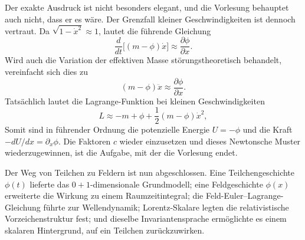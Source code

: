 Der exakte Ausdruck ist nicht besonders elegant, und die Vorlesung behauptet auch nicht, dass er es wäre. Der Grenzfall kleiner Geschwindigkeiten ist dennoch vertraut. Da \(\sqrt{1-\dot x^2}\approx1\), lautet die führende Gleichung
\begin{equation}
\frac{d}{dt}\bigl[(m-\phi)\dot x\bigr]
\approx
\frac{\partial\phi}{\partial x}.
\end{equation}
Wird auch die Variation der effektiven Masse störungstheoretisch behandelt, vereinfacht sich dies zu
\begin{equation}
(m-\phi)\ddot x
\approx
\frac{\partial\phi}{\partial x}.
\label{eq:sr4-nonrel-force}
\end{equation}
Tatsächlich lautet die Lagrange-Funktion bei kleinen Geschwindigkeiten
\begin{equation}
L
\approx
-m+\phi+\frac12(m-\phi)\dot x^2,
\end{equation}
Somit sind in führender Ordnung die potenzielle Energie \(U=-\phi\) und die Kraft \(-dU/dx=\partial_x\phi\). Die Faktoren \(c\) wieder einzusetzen und dieses Newtonsche Muster wiederzugewinnen, ist die Aufgabe, mit der die Vorlesung endet.

Der Weg von Teilchen zu Feldern ist nun abgeschlossen. Eine Teilchengeschichte \(\phi(t)\) lieferte das \(0+1\)-dimensionale Grundmodell; eine Feldgeschichte \(\phi(x)\) erweiterte die Wirkung zu einem Raumzeitintegral; die Feld-Euler--Lagrange-Gleichung führte zur Wellendynamik; Lorentz-Skalare legten die relativistische Vorzeichenstruktur fest; und dieselbe Invariantensprache ermöglichte es einem skalaren Hintergrund, auf ein Teilchen zurückzuwirken.
